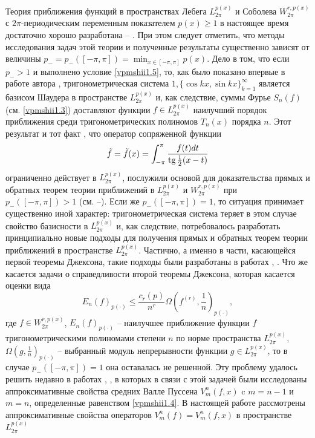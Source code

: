Теория приближения функций в пространствах Лебега $L_{2\pi}^{p(x)}$  и Соболева $W^{r,p(x)}_{2\pi}$ с $2\pi$-пери\-одическим переменным показателем $p(x)\ge1$ в настоящее время достаточно хорошо разработана \cite{vpmshiiShar5}  -- \cite{vpmshiiShar6}. При этом следует отметить, что методы исследования задач этой теории и полученные результаты существенно зависят от  величины $p_-=p_-([-\pi,\pi])=\min_{x\in[-\pi,\pi]}p(x)$. Дело в том, что если $p_->1$ и выполнено условие \eqref{vpmshii1.5}, то, как было показано впервые в работе автора \cite{vpmshiiShar2}, тригонометрическая система $1, \{\cos kx, \sin kx\}_{k=1}^\infty$ является базисом Шаудера в пространстве  $L_{2\pi}^{p(x)}$ и, как следствие, суммы Фурье $S_n(f)$ (см. \eqref{vpmshii1.3})  доставляют функции $f\in L_{2\pi}^{p(x)}$ наилучший порядок приближения среди тригонометрических полиномов $T_n(x)$ порядка $n$. Этот результат и тот факт  \cite{vpmshiiShar2}, что оператор сопряженной функции
$$
\tilde f=\tilde f(x)=\int_{-\pi}^{\pi}{f(t)dt\over \operatorname{tg}\frac12(x-t)}
$$
 ограниченно действует в  $L_{2\pi}^{p(x)}$, послужили основой   для доказательства прямых и обратных теорем теории приближений в $L_{2\pi}^{p(x)}$ и $W_{2\pi}^{r,p(x)}$ при $p_-([-\pi,\pi])>1$  (см. \cite{vpmshiiGuvIsr}--\cite{vpmshiiChaich}). Если же  $p_-([-\pi,\pi])=1$, то ситуация принимает существенно иной характер: тригонометрическая система теряет в этом случае свойство базисности в $L_{2\pi}^{p(x)}$ и, как следствие, потребовалось \cite{vpmshiiShar6} разработать принципиально новые подходы для получения прямых и обратных теорем теории приближений в пространстве $L_{2\pi}^{p(x)}$. Частично, а именно в части, касающейся первой теоремы Джексона, такие подходы были разработаны в работах \cite{shiimonog}, \cite{vpmshiiShar6}. Что же касается задачи о справедливости второй теоремы Джексона, которая касается оценки вида
 \begin{equation}\label{vpmshiieq1.6}
   E_n(f)_{p(\cdot)}\le \frac{c_r(p)}{n^r}\Omega(f^{(r)},\frac1n)_{p(\cdot)},
 \end{equation}
 где $f\in W_{2\pi}^{r,p(x)}$, $E_n(f)_{p(\cdot)}$ -- наилучшее приближение функции $f$ тригонометрическими полиномами степени $n$ по норме пространства $L_{2\pi}^{p(x)}$, $\Omega(g,\frac1n)_{p(\cdot)}$ -- выбранный модуль непрерывности функции $g\in L_{2\pi}^{p(x)}$, то в случае $p_-([-\pi,\pi])=1$ она оставалась не решенной. Эту проблему удалось решить недавно в работах \cite{vpmshiiShar7}, \cite{vpmshiiShar8}, в которых в связи с этой задачей были  исследованы аппроксимативные свойства  средних Валле Пуссена $V_m^n(f,x)$ c $m=n-1$ и  $m=n$, определенные равенством   \eqref{vpmshii1.4}. В настоящей работе рассмотрены аппроксимативные свойства операторов $V_m^n(f)=V_m^n(f,x)$ в пространстве $ L_{2\pi}^{p(x)}$
